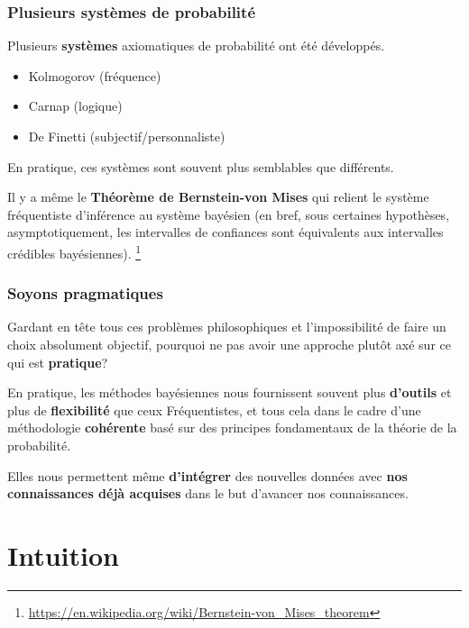 \documentclass{beamer}
\begin{document}
\begin{frame}
    \frametitle{Plusieurs systèmes de probabilité}
    Plusieurs \textbf{systèmes} axiomatiques de probabilité ont été développés.

    \begin{itemize}
      \item Kolmogorov (fréquence)
      \item Carnap (logique)
      \item De Finetti (subjectif/personnaliste)
    \end{itemize}

    \vfill

    En pratique, ces systèmes sont souvent plus semblables que différents.

    \vfill

    Il y a même le \textbf{Théorème de Bernstein-von Mises} qui relient le système fréquentiste
    d’inférence au système bayésien (en bref, sous certaines hypothèses, asymptotiquement,
    les intervalles de confiances sont équivalents aux intervalles crédibles bayésiennes).
    \footnote{
      \url{https://en.wikipedia.org/wiki/Bernstein-von_Mises_theorem}
    }
\end{frame}


\begin{frame}
    \frametitle{Soyons pragmatiques}
    Gardant en tête tous ces problèmes philosophiques et l’impossibilité de faire un choix absolument objectif,
    pourquoi ne pas avoir une approche plutôt axé sur ce qui est \textbf{pratique}?

    \vfill

    En pratique, les méthodes bayésiennes nous fournissent souvent plus \textbf{d’outils} et plus de
    \textbf{flexibilité} que ceux Fréquentistes, et tous cela dans le cadre d’une méthodologie \textbf{cohérente}
    basé sur des principes fondamentaux de la théorie de la probabilité.
    
    \vfill

    Elles nous permettent même \textbf{d’intégrer} des nouvelles données avec \textbf{nos connaissances déjà acquises} 
    dans le but d’avancer nos connaissances.
\end{frame}



\section{Intuition}
\end{document}
